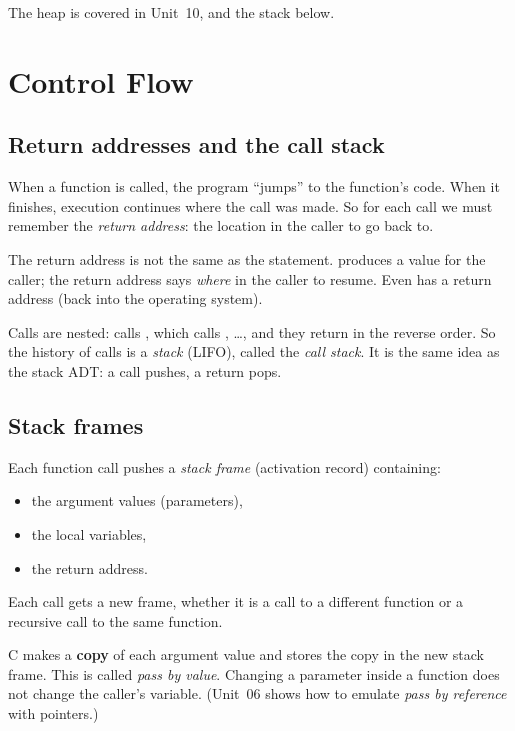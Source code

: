 The heap is covered in Unit~10, and the stack below.

\section{Control Flow}

\subsection{Return addresses and the call stack}

When a function is called, the program ``jumps'' to the function's code. When it finishes,
execution continues where the call was made. So for each call we must remember the
\emph{return address}: the location in the caller to go back to.

\begin{remark}
The return address is not the same as the  statement.  produces a
value for the caller; the return address says \emph{where} in the caller to resume. Even
 has a return address (back into the operating system).
\end{remark}

Calls are nested:  calls , which calls , \dots, and they return in the
reverse order. So the history of calls is a \emph{stack} (LIFO), called the \emph{call stack}. It
is the same idea as the stack ADT: a call pushes, a return pops.

\subsection{Stack frames}

Each function call pushes a \emph{stack frame} (activation record) containing:
\begin{itemize}
  \item the argument values (parameters),
  \item the local variables,
  \item the return address.
\end{itemize}
Each call gets a new frame, whether it is a call to a different function or a recursive call to
the same function.

\begin{important}
C makes a \textbf{copy} of each argument value and stores the copy in the new stack frame. This
is called \emph{pass by value}. Changing a parameter inside a function does not change the
caller's variable. (Unit~06 shows how to emulate \emph{pass by reference} with pointers.)
\end{important}

